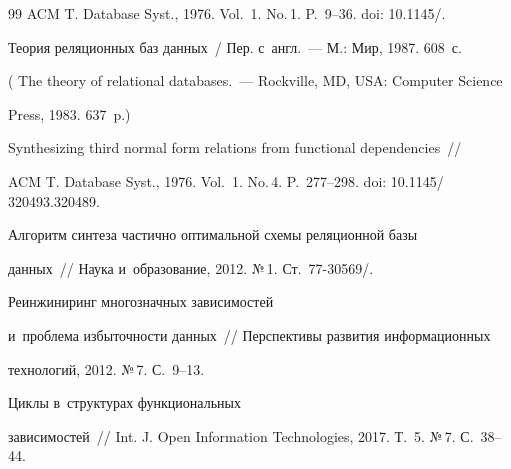{{\begin{thebibliography}{99}
ACM T. Database Syst., 1976. Vol.~1. No.\,1. P.~9--36. doi: 10.1145\!/.


 Теория реляционных баз данных~/ Пер. с~англ.~--- М.: Мир, 1987. 608~с.

( {The theory of relational databases}.~--- Rockville, MD, USA: Computer Science 

Press, 1983. 637~p.)




 Synthesizing third normal form relations from functional dependencies~/\!\!/ 

ACM T. Database Syst., 1976. Vol.~1. No.\,4. P.~277--298. doi: 10.1145\!/ 320493.320489.


 Алгоритм синтеза час\-тич\-но оптимальной схемы реляционной базы 

данных~/\!\!/ Наука и~образование, 2012. №\,1. Ст.~77-30569\!/.


 Реинжиниринг мно\-го\-знач\-ных зависимостей 

и~проб\-ле\-ма избыточности данных~/\!\!/ Перс\-пек\-ти\-вы развития информационных 

технологий, 2012. №\,7. С.~9--13.





 Циклы в~структурах функциональных 

зависимостей~/\!\!/ Int. J. Open Information Technologies, 2017. Т.~5. №\,7. С.~38--44.





 \end{thebibliography}

} }







\vspace*{-6pt}



